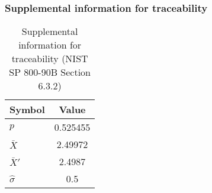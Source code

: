 \documentclass[a3paper,xelatex,english]{bxjsarticle}
\begin{document}
\subsubsection{Supplemental information for traceability}
\renewcommand{\arraystretch}{1.8}
\begin{table}[h]
\caption{Supplemental information for traceability (NIST SP 800-90B Section 6.3.2)}
\begin{center}
\begin{tabular}{|l|c|}
\hline 
\rowcolor{anotherlightblue} %
Symbol				& Value \\ \hline 
$p$				& 0.525455\\ \hline 
$\bar{X}$ 		&  2.49972\\ \hline
$\bar{X}'$		&   2.4987\\ \hline
$\hat{\sigma}$		&      0.5\\ \hline
\end{tabular}
\end{center}
\end{table}
\renewcommand{\arraystretch}{1.4}
\clearpage
\end{document}
